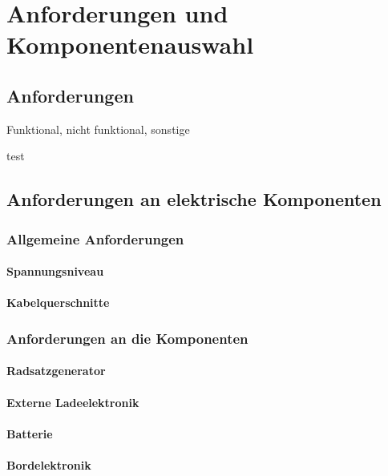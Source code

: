 \section{Anforderungen und Komponentenauswahl}


\subsection{Anforderungen}
Funktional, nicht funktional, sonstige
\begin{feat}[Anf. X]
test
\end{feat}

\subsection{Anforderungen an elektrische Komponenten}

\subsubsection{Allgemeine Anforderungen}
\paragraph{Spannungsniveau}
\paragraph{Kabelquerschnitte}

\subsubsection{Anforderungen an die Komponenten}
\paragraph{Radsatzgenerator}
\paragraph{Externe Ladeelektronik}
\paragraph{Batterie}
\paragraph{Bordelektronik}
